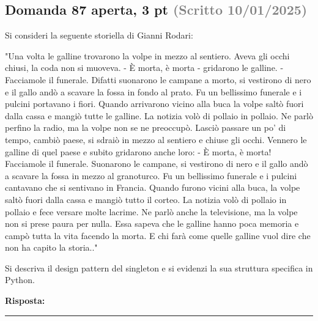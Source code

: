\documentclass[a4paper,11pt]{article}
\begin{document}
\subsection*{Domanda 87 \hfill {\small aperta, 3 pt \textcolor{gray}{(Scritto 10/01/2025)}}}
\begin{tcolorbox}[colback=gray!8,colframe=gray!50,title=Contesto]
Si consideri la seguente storiella di Gianni Rodari:

"Una volta le galline trovarono la volpe in mezzo al sentiero. Aveva gli occhi chiusi, la coda non si muoveva. - È morta, è morta - gridarono le galline. - Facciamole il funerale. Difatti suonarono le campane a morto, si vestirono di nero e il gallo andò a scavare la fossa in fondo al prato. Fu un bellissimo funerale e i pulcini portavano i fiori. Quando arrivarono vicino alla buca la volpe saltò fuori dalla cassa e mangiò tutte le galline.
La notizia volò di pollaio in pollaio. Ne parlò perfino la radio, ma la volpe non se ne preoccupò. Lasciò passare un po' di tempo, cambiò paese, si sdraiò in mezzo al sentiero e chiuse gli occhi. Vennero le galline di quel paese e subito gridarono anche loro: - È morta, è morta! Facciamole il funerale.
Suonarono le campane, si vestirono di nero e il gallo andò a scavare la fossa in mezzo al granoturco. Fu un bellissimo funerale e i pulcini cantavano che si sentivano in Francia. Quando furono vicini alla buca, la volpe saltò fuori dalla cassa e mangiò tutto il corteo.
La notizia volò di pollaio in pollaio e fece versare molte lacrime. Ne parlò anche la televisione, ma la volpe non si prese paura per nulla. Essa sapeva che le galline hanno poca memoria e campò tutta la vita facendo la morta. E chi farà come quelle galline vuol dire che non ha capito la storia.."
\end{tcolorbox}
Si descriva il design pattern del singleton e si evidenzi la sua struttura specifica in Python.

\vspace{0.2cm}
\noindent\textbf{Risposta:}\par
\vspace{4cm}\hrule


\end{document}
